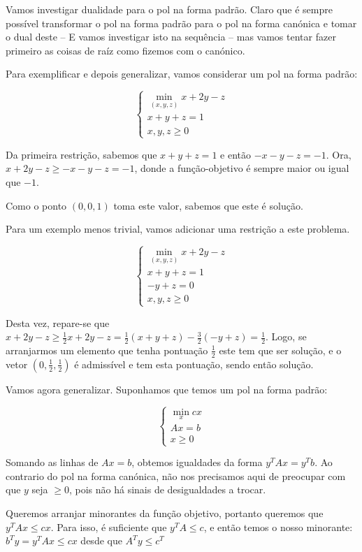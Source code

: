 \documentclass{article}
\theoremstyle{definition}
\begin{document}
	Vamos investigar dualidade para o pol na forma padrão. Claro que é sempre possível transformar o pol na forma padrão para o pol na forma canónica e tomar  o dual deste -- E vamos investigar isto na sequência -- mas vamos tentar fazer primeiro as coisas de raíz como fizemos com o canónico.
	
	Para exemplificar e depois generalizar, vamos considerar um pol na forma padrão:
	
	\[
	\begin{cases}
	\min\limits_{(x,y,z)} x + 2y - z\\
	x + y + z = 1\\
	x,y,z \geq 0
	\end{cases}
	\]
	
	Da primeira restrição, sabemos que $x+y+z = 1$ e então $-x-y-z = -1$. Ora, $x + 2y - z \geq -x-y-z = -1$, donde a função-objetivo é sempre maior ou igual que $-1$.
	
	Como o ponto $(0,0,1)$ toma este valor, sabemos que este é solução.
	
	Para um exemplo menos trivial, vamos adicionar uma restrição a este problema.
	
	\[
	\begin{cases}
	\min\limits_{(x,y,z)} x + 2y - z\\
	x + y + z = 1\\
	-y  + z = 0\\
	x,y,z \geq 0
	\end{cases}
	\]
	
	Desta vez, repare-se que $x + 2y - z \geq \frac 1 2 x + 2y - z = \frac 1 2 (x + y + z) - \frac 3 2 (-y + z) = \frac 1 2$. Logo, se arranjarmos um elemento que tenha pontuação $\frac 1 2$ este tem que ser solução, e o vetor $(0,\frac 1  2, \frac 1 2)$ é admissível e tem esta pontuação, sendo então solução.
	
	Vamos agora generalizar. Suponhamos que temos um pol na forma padrão:
	
	\[
	\begin{cases}
	\min\limits_x cx\\
	Ax = b\\
	x \geq 0
	\end{cases}
	\]
	
	Somando as linhas de $Ax = b$, obtemos igualdades da forma $y^T Ax = y^T b$. Ao contrario do pol na forma canónica, não nos precisamos aqui de preocupar com que $y$ seja $\geq 0$, pois não há sinais de desigualdades a trocar.
	
	Queremos arranjar minorantes da função objetivo, portanto queremos que $y^T A x \leq cx$. Para isso, é suficiente que $y^T A \leq c$, e então temos o nosso minorante: $b^T y = y^T A x \leq cx$ desde que $A^T y \leq c^T$
	
\end{document}
